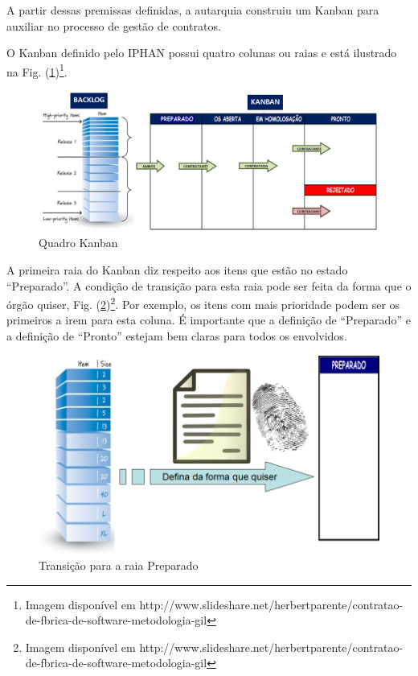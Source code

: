 A partir dessas premissas definidas, a autarquia construiu um Kanban para auxiliar no processo de gestão de contratos.

O Kanban definido pelo IPHAN possui quatro colunas ou raias e está ilustrado na Fig. (\ref{kanban1})\footnote{Imagem disponível em http://www.slideshare.net/herbertparente/contratao-de-fbrica-de-software-metodologia-gil}.

\begin{figure}[H]
		\centering
		
			\includegraphics[scale=0.5]{figuras/kanbanIPHAN1.png}
		\caption{Quadro Kanban}
	\label{kanban1}
\end{figure}

A primeira raia do Kanban diz respeito aos itens que estão no estado “Preparado”. A condição de transição para esta raia pode ser feita da forma que o órgão quiser, Fig. (\ref{kanban2})\footnote{Imagem disponível em http://www.slideshare.net/herbertparente/contratao-de-fbrica-de-software-metodologia-gil}. Por exemplo, os itens com mais prioridade podem ser os primeiros a irem para esta coluna. É importante que a definição de “Preparado” e a definição de “Pronto” estejam bem claras para todos os envolvidos.  

\begin{figure}[H]
		\centering
		
			\includegraphics[scale=0.5]{figuras/kanbanIPHAN2.png}
		\caption{Transição para a raia Preparado}
		\label{kanban2}
\end{figure}

